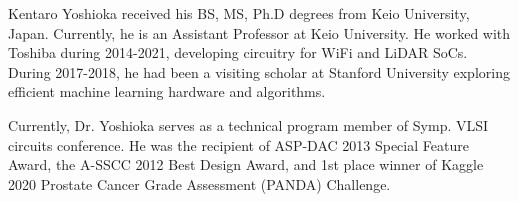 \documentclass[paper]{ieice}
\begin{document}




\begin{IEEEbiography}
{Kentaro Yoshioka}
received his BS, MS, Ph.D degrees from Keio University, Japan. Currently, he is an Assistant Professor at Keio University. He worked with Toshiba during 2014-2021, developing circuitry for WiFi and LiDAR SoCs. During 2017-2018, he had been a visiting scholar at Stanford University exploring efficient machine learning hardware and algorithms. 

Currently, Dr. Yoshioka serves as a technical program member of Symp. VLSI circuits conference. He was the recipient of ASP-DAC 2013 Special Feature Award, the A-SSCC 2012 Best Design Award, and 1st place winner of Kaggle 2020 Prostate Cancer Grade Assessment (PANDA) Challenge.
\end{IEEEbiography}
\end{document}
